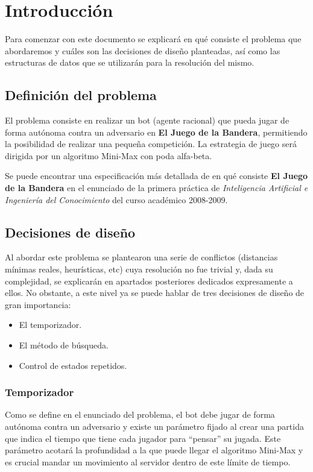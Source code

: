 
\chapter {Introducción}
Para comenzar con este documento se explicará en qué consiste el
problema que abordaremos y cuáles son las decisiones de diseño
planteadas, así como las estructuras de datos que se utilizarán para la
resolución del mismo.


\section {Definición del problema}
El problema consiste en realizar un bot (agente racional) que pueda
jugar de forma autónoma contra un adversario en \textbf{El Juego de la
Bandera}, permitiendo la posibilidad de realizar una pequeña
competición. La estrategia de juego será dirigida por un algoritmo
Mini-Max con poda alfa-beta.

Se puede encontrar una especificación más detallada de en qué consiste
\textbf{El Juego de la Bandera} en el enunciado de la primera práctica
de \emph{Inteligencia Artificial e Ingeniería del Conocimiento} del
curso académico 2008-2009.


\section {Decisiones de diseño}
Al abordar este problema se plantearon una serie de conflictos
(distancias mínimas reales, heurísticas, etc) cuya resolución no fue
trivial y, dada su complejidad, se explicarán en apartados posteriores
dedicados expresamente a ellos. No obstante, a este nivel ya se puede
hablar de tres decisiones de diseño de gran importancia:
\begin{itemize}
\item El temporizador.
\item El método de búsqueda.
\item Control de estados repetidos.
\end{itemize}

\subsection{Temporizador}
Como se define en el enunciado del problema, el bot debe jugar de
forma autónoma contra un adversario y existe un parámetro fijado al
crear una partida que indica el tiempo que tiene cada jugador para
``pensar'' su jugada. Este parámetro acotará la profundidad a la que
puede llegar el algoritmo Mini-Max y es crucial mandar un movimiento
al servidor dentro de este límite de tiempo.

